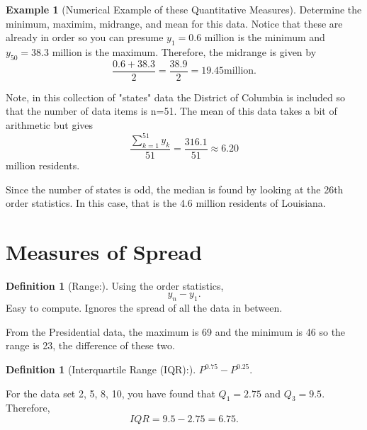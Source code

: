 \documentclass[10pt,]{book}
\theoremstyle{plain}
\theoremstyle{definition}
\newtheorem{definition}[theorem]{Definition}
\theoremstyle{definition}
\newtheorem{example}[theorem]{Example}
\theoremstyle{definition}
\numberwithin{equation}{section}
\begin{document}
\begin{example}[Numerical Example of these Quantitative Measures]
Determine the minimum, maximim, midrange, and mean for this data.
	Notice that these are already in order so you can presume 
		\(y_1 = 0.6\) million is the minimum and \(y_{50} = 38.3\) 
		million is the maximum. Therefore, the midrange is given by
		\begin{equation*}\frac{0.6+38.3}{2} = \frac{38.9}{2} = 19.45 \text{million}.\end{equation*}

		Note, in this collection of "states" data the District of Columbia is included so that the number of data items is n=51. The mean of this data takes a bit of arithmetic but gives
		\begin{equation*}\frac{\sum_{k=1}^{51} y_k }{51} = \frac{316.1}{51} \approx 6.20\end{equation*}
		million residents. 
\par

		Since the number of states is odd, the median is found by looking at the 26th order statistics. In this case, that is the 4.6 million residents of Louisiana.


%
\end{example}
\typeout{************************************************}
\typeout{************************************************}
\section[{Measures of Spread}]{Measures of Spread}\label{section-8}
\begin{definition}[{Range:}]\label{definition-12}
Using the order statistics, \begin{equation*}y_n - y_1.\end{equation*}  
Easy to compute. Ignores the spread of all the data in between.
%
\end{definition}
From the Presidential data, the maximum is 69 and the minimum is 46 so the range is 23, the difference of these two. %
\begin{definition}[{Interquartile Range (IQR):}]\label{definition-13}
\(P^{0.75} - P^{0.25}\). 
%
\end{definition}
\par

For the data set {2, 5, 8, 10}, you have found that \(Q_1 = 2.75\) and \(Q_3 = 9.5\). Therefore, \begin{equation*}IQR = 9.5 - 2.75 = 6.75.\end{equation*}
%
\par
\end{document}
